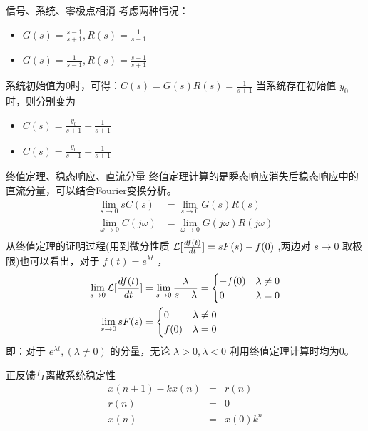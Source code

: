\documentclass[presentation]{beamer}
\begin{document}
\begin{frame}[label={sec:org91aacdb}]{信号、系统、零极点相消}
考虑两种情况：

\begin{itemize}
\item \(G(s)=\frac{s-1}{s+1},R(s)=\frac{1}{s-1}\)
\item \(G(s)=\frac{1}{s-1},R(s)=\frac{s-1}{s+1}\)
\end{itemize}

系统初始值为0时，可得：\(C(s)=G(s)R(s)=\frac{1}{s+1}\)
当系统存在初始值 \(y_0\) 时，则分别变为

\begin{itemize}
\item \(C(s)=\frac{y_0}{s+1}+\frac{1}{s+1}\)
\item \(C(s)=\frac{y_0}{s-1}+\frac{1}{s+1}\)
\end{itemize}
\end{frame}

\begin{frame}[label={sec:org7afcec9}]{终值定理、稳态响应、直流分量}
终值定理计算的是瞬态响应消失后稳态响应中的直流分量，可以结合Fourier变换分析。
\begin{align*}
\lim_{s\to 0}sC(s) &= \lim_{s\to 0}G(s)R(s) \\
\lim_{\omega\to 0}C(j\omega) &= \lim_{\omega\to 0}G(j\omega)R(j\omega)\\
\end{align*}
从终值定理的证明过程(用到微分性质 \({\cal L}[\frac{df(t)}{dt}]=sF(s)-f(0)\) ,两边对 \(s\to 0\) 取极限)也可以看出，对于 \(f(t)=e^{\lambda t}\) ，
\begin{align*}
\lim_{s\to 0}{\cal L} [\frac{df(t)}{dt}]&=\lim_{s\to 0}\frac{\lambda}{s-\lambda}=
\begin{cases}
-f(0)  & \lambda\neq 0\\
0   & \lambda=0
\end{cases}\\
\lim_{s\to 0} sF(s) &=
\begin{cases}
0  & \lambda\neq 0\\
f(0)   & \lambda=0
\end{cases}
\end{align*}
即：对于 \(e^{\lambda t},(\lambda\neq0)\) 的分量，无论 \(\lambda>0,\lambda<0\) 利用终值定理计算时均为0。
\end{frame}
\begin{frame}[label={sec:org4bce580}]{正反馈与离散系统稳定性}
\begin{eqnarray*}
x(n+1)-kx(n) &=& r(n) \\
r(n) & = & 0 \\
x(n) &=& x(0)k^n
\end{eqnarray*}
\end{frame}
\end{document}

